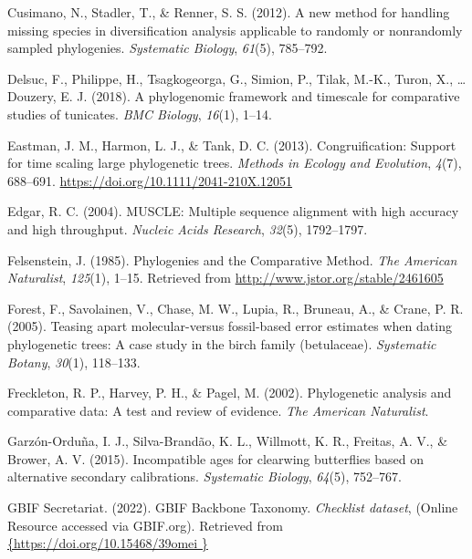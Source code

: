 \documentclass[english,man]{apa6}
\begin{document}
\leavevmode\hypertarget{ref-cusimano2012new}{}%
Cusimano, N., Stadler, T., \& Renner, S. S. (2012). A new method for handling missing species in diversification analysis applicable to randomly or nonrandomly sampled phylogenies. \emph{Systematic Biology}, \emph{61}(5), 785--792.

\leavevmode\hypertarget{ref-delsuc2018phylogenomic}{}%
Delsuc, F., Philippe, H., Tsagkogeorga, G., Simion, P., Tilak, M.-K., Turon, X., \ldots{} Douzery, E. J. (2018). A phylogenomic framework and timescale for comparative studies of tunicates. \emph{BMC Biology}, \emph{16}(1), 1--14.

\leavevmode\hypertarget{ref-Eastman2013}{}%
Eastman, J. M., Harmon, L. J., \& Tank, D. C. (2013). Congruification: Support for time scaling large phylogenetic trees. \emph{Methods in Ecology and Evolution}, \emph{4}(7), 688--691. \url{https://doi.org/10.1111/2041-210X.12051}

\leavevmode\hypertarget{ref-edgar2004muscle}{}%
Edgar, R. C. (2004). MUSCLE: Multiple sequence alignment with high accuracy and high throughput. \emph{Nucleic Acids Research}, \emph{32}(5), 1792--1797.

\leavevmode\hypertarget{ref-Felsenstein1985a}{}%
Felsenstein, J. (1985). Phylogenies and the Comparative Method. \emph{The American Naturalist}, \emph{125}(1), 1--15. Retrieved from \url{http://www.jstor.org/stable/2461605}

\leavevmode\hypertarget{ref-forest2005teasing}{}%
Forest, F., Savolainen, V., Chase, M. W., Lupia, R., Bruneau, A., \& Crane, P. R. (2005). Teasing apart molecular-versus fossil-based error estimates when dating phylogenetic trees: A case study in the birch family (betulaceae). \emph{Systematic Botany}, \emph{30}(1), 118--133.

\leavevmode\hypertarget{ref-freckleton2002phylogenetic}{}%
Freckleton, R. P., Harvey, P. H., \& Pagel, M. (2002). Phylogenetic analysis and comparative data: A test and review of evidence. \emph{The American Naturalist}.

\leavevmode\hypertarget{ref-garzon2015incompatible}{}%
Garzón-Orduña, I. J., Silva-Brandão, K. L., Willmott, K. R., Freitas, A. V., \& Brower, A. V. (2015). Incompatible ages for clearwing butterflies based on alternative secondary calibrations. \emph{Systematic Biology}, \emph{64}(5), 752--767.

\leavevmode\hypertarget{ref-gbif2022taxonomy}{}%
GBIF Secretariat. (2022). GBIF Backbone Taxonomy. \emph{Checklist dataset}, (Online Resource accessed via GBIF.org). Retrieved from \href{\%7Bhttps://doi.org/10.15468/39omei\%20\%7D}{\{https://doi.org/10.15468/39omei \}}
\end{document}
